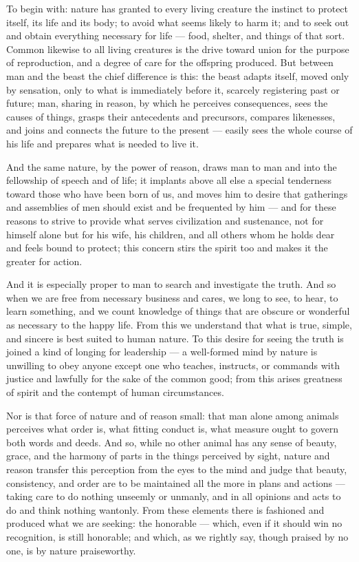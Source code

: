  To begin with: nature has granted to every living creature the instinct to protect itself, its life and its body; to avoid what seems likely to harm it; and to seek out and obtain everything necessary for life — food, shelter, and things of that sort. Common likewise to all living creatures is the drive toward union for the purpose of reproduction, and a degree of care for the offspring produced. But between man and the beast the chief difference is this: the beast adapts itself, moved only by sensation, only to what is immediately before it, scarcely registering past or future; man, sharing in reason, by which he perceives consequences, sees the causes of things, grasps their antecedents and precursors, compares likenesses, and joins and connects the future to the present — easily sees the whole course of his life and prepares what is needed to live it.

 And the same nature, by the power of reason, draws man to man and into the fellowship of speech and of life; it implants above all else a special tenderness toward those who have been born of us, and moves him to desire that gatherings and assemblies of men should exist and be frequented by him — and for these reasons to strive to provide what serves civilization and sustenance, not for himself alone but for his wife, his children, and all others whom he holds dear and feels bound to protect; this concern stirs the spirit too and makes it the greater for action.

 And it is especially proper to man to search and investigate the truth. And so when we are free from necessary business and cares, we long to see, to hear, to learn something, and we count knowledge of things that are obscure or wonderful as necessary to the happy life. From this we understand that what is true, simple, and sincere is best suited to human nature. To this desire for seeing the truth is joined a kind of longing for leadership — a well-formed mind by nature is unwilling to obey anyone except one who teaches, instructs, or commands with justice and lawfully for the sake of the common good; from this arises greatness of spirit and the contempt of human circumstances.

 Nor is that force of nature and of reason small: that man alone among animals perceives what order is, what fitting conduct is, what measure ought to govern both words and deeds. And so, while no other animal has any sense of beauty, grace, and the harmony of parts in the things perceived by sight, nature and reason transfer this perception from the eyes to the mind and judge that beauty, consistency, and order are to be maintained all the more in plans and actions — taking care to do nothing unseemly or unmanly, and in all opinions and acts to do and think nothing wantonly. From these elements there is fashioned and produced what we are seeking: the honorable — which, even if it should win no recognition, is still honorable; and which, as we rightly say, though praised by no one, is by nature praiseworthy.

